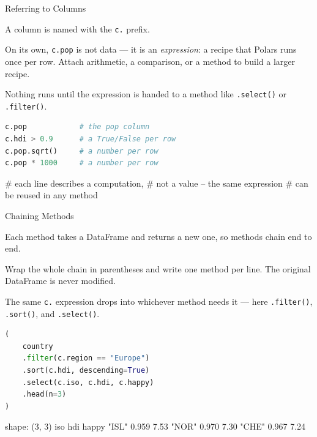 \documentclass[8pt,aspectratio=169]{beamer}
\begin{document}
\begin{frame}[fragile]{Referring to Columns}
\begin{splitcode}{%

A column is named with the \texttt{c.} prefix.

On its own, \texttt{c.pop} is not data --- it is an \textit{expression}: a recipe that Polars runs once per row. Attach arithmetic, a comparison, or a method to build a larger recipe.

Nothing runs until the expression is handed to a method like \texttt{.select()} or \texttt{.filter()}.

}
\begin{lstlisting}[language=Python]
c.pop            # the pop column
c.hdi > 0.9      # a True/False per row
c.pop.sqrt()     # a number per row
c.pop * 1000     # a number per row
\end{lstlisting}
\begin{codeoutput}
# each line describes a computation,
# not a value -- the same expression
# can be reused in any method
\end{codeoutput}
\end{splitcode}
\end{frame}

\begin{frame}[fragile]{Chaining Methods}
\begin{splitcode}{%

Each method takes a DataFrame and returns a new one, so methods chain end to end.

Wrap the whole chain in parentheses and write one method per line. The original DataFrame is never modified.

The same \texttt{c.} expression drops into whichever method needs it --- here \texttt{.filter()}, \texttt{.sort()}, and \texttt{.select()}.

}
\begin{lstlisting}[language=Python]
(
    country
    .filter(c.region == "Europe")
    .sort(c.hdi, descending=True)
    .select(c.iso, c.hdi, c.happy)
    .head(n=3)
)
\end{lstlisting}
\begin{codeoutput}
shape: (3, 3)
iso    hdi    happy
"ISL"  0.959  7.53
"NOR"  0.970  7.30
"CHE"  0.967  7.24
\end{codeoutput}
\end{splitcode}
\end{frame}
\end{document}
